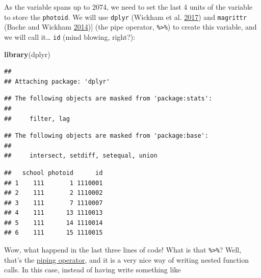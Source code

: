 \documentclass[]{book}
\newenvironment{Shaded}{\begin{snugshade}}{\end{snugshade}}
\newcommand{\KeywordTok}[1]{\textcolor[rgb]{0.13,0.29,0.53}{\textbf{#1}}}
\newcommand{\DataTypeTok}[1]{\textcolor[rgb]{0.13,0.29,0.53}{#1}}
\newcommand{\DecValTok}[1]{\textcolor[rgb]{0.00,0.00,0.81}{#1}}
\newcommand{\StringTok}[1]{\textcolor[rgb]{0.31,0.60,0.02}{#1}}
\newcommand{\OperatorTok}[1]{\textcolor[rgb]{0.81,0.36,0.00}{\textbf{#1}}}
\newcommand{\NormalTok}[1]{#1}
\theoremstyle{definition}
\theoremstyle{definition}
\theoremstyle{definition}
\theoremstyle{remark}
\begin{document}
As the variable spans up to 2074, we need to set the last 4 units of the
variable to store the \texttt{photoid}. We will use \texttt{dplyr}
(Wickham et al. \protect\hyperlink{ref-R-dplyr}{2017}) and
\texttt{magrittr} (Bache and Wickham
\protect\hyperlink{ref-R-magrittr}{2014}){]} (the pipe operator,
\texttt{\%\textgreater{}\%}) to create this variable, and we will call
it\ldots{} \texttt{id} (mind blowing, right?):

\begin{Shaded}
\begin{Highlighting}[]
\KeywordTok{library}\NormalTok{(dplyr)}
\end{Highlighting}
\end{Shaded}

\begin{verbatim}
## 
## Attaching package: 'dplyr'
\end{verbatim}

\begin{verbatim}
## The following objects are masked from 'package:stats':
## 
##     filter, lag
\end{verbatim}

\begin{verbatim}
## The following objects are masked from 'package:base':
## 
##     intersect, setdiff, setequal, union
\end{verbatim}

\begin{Shaded}
\end{Shaded}

\begin{verbatim}
##   school photoid      id
## 1    111       1 1110001
## 2    111       2 1110002
## 3    111       7 1110007
## 4    111      13 1110013
## 5    111      14 1110014
## 6    111      15 1110015
\end{verbatim}

Wow, what happend in the last three lines of code! What is that
\texttt{\%\textgreater{}\%}? Well, that's the
\href{http://r4ds.had.co.nz/pipes.html}{piping operator}, and it is a
very nice way of writing nested function calls. In this case, instead of
having write something like
\end{document}
